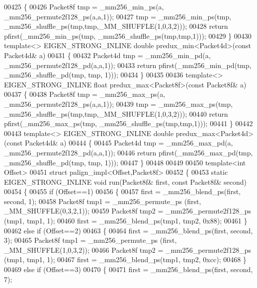 \begin{DoxyCode}
{{00425 \{
00426   Packet8f tmp = \_mm256\_min\_ps(a, \_mm256\_permute2f128\_ps(a,a,1));
00427   tmp = \_mm256\_min\_ps(tmp, \_mm256\_shuffle\_ps(tmp,tmp,\_MM\_SHUFFLE(1,0,3,2)));
00428   \textcolor{keywordflow}{return} pfirst(\_mm256\_min\_ps(tmp, \_mm256\_shuffle\_ps(tmp,tmp,1)));
00429 \}
00430 \textcolor{keyword}{template}<> EIGEN\_STRONG\_INLINE \textcolor{keywordtype}{double} predux\_min<Packet4d>(\textcolor{keyword}{const} Packet4d& a)
00431 \{
00432   Packet4d tmp = \_mm256\_min\_pd(a, \_mm256\_permute2f128\_pd(a,a,1));
00433   \textcolor{keywordflow}{return} pfirst(\_mm256\_min\_pd(tmp, \_mm256\_shuffle\_pd(tmp, tmp, 1)));
00434 \}
00435 
00436 \textcolor{keyword}{template}<> EIGEN\_STRONG\_INLINE \textcolor{keywordtype}{float} predux\_max<Packet8f>(\textcolor{keyword}{const} Packet8f& a)
00437 \{
00438   Packet8f tmp = \_mm256\_max\_ps(a, \_mm256\_permute2f128\_ps(a,a,1));
00439   tmp = \_mm256\_max\_ps(tmp, \_mm256\_shuffle\_ps(tmp,tmp,\_MM\_SHUFFLE(1,0,3,2)));
00440   \textcolor{keywordflow}{return} pfirst(\_mm256\_max\_ps(tmp, \_mm256\_shuffle\_ps(tmp,tmp,1)));
00441 \}
00442 
00443 \textcolor{keyword}{template}<> EIGEN\_STRONG\_INLINE \textcolor{keywordtype}{double} predux\_max<Packet4d>(\textcolor{keyword}{const} Packet4d& a)
00444 \{
00445   Packet4d tmp = \_mm256\_max\_pd(a, \_mm256\_permute2f128\_pd(a,a,1));
00446   \textcolor{keywordflow}{return} pfirst(\_mm256\_max\_pd(tmp, \_mm256\_shuffle\_pd(tmp, tmp, 1)));
00447 \}
00448 
00449 
00450 \textcolor{keyword}{template}<\textcolor{keywordtype}{int} Offset>
00451 \textcolor{keyword}{struct }palign\_impl<Offset,Packet8f>
00452 \{
00453   \textcolor{keyword}{static} EIGEN\_STRONG\_INLINE \textcolor{keywordtype}{void} run(Packet8f& first, \textcolor{keyword}{const} Packet8f& second)
00454   \{
00455     \textcolor{keywordflow}{if} (Offset==1)
00456     \{
00457       first = \_mm256\_blend\_ps(first, second, 1);
00458       Packet8f tmp1 = \_mm256\_permute\_ps (first, \_MM\_SHUFFLE(0,3,2,1));
00459       Packet8f tmp2 = \_mm256\_permute2f128\_ps (tmp1, tmp1, 1);
00460       first = \_mm256\_blend\_ps(tmp1, tmp2, 0x88);
00461     \}
00462     \textcolor{keywordflow}{else} \textcolor{keywordflow}{if} (Offset==2)
00463     \{
00464       first = \_mm256\_blend\_ps(first, second, 3);
00465       Packet8f tmp1 = \_mm256\_permute\_ps (first, \_MM\_SHUFFLE(1,0,3,2));
00466       Packet8f tmp2 = \_mm256\_permute2f128\_ps (tmp1, tmp1, 1);
00467       first = \_mm256\_blend\_ps(tmp1, tmp2, 0xcc);
00468     \}
00469     \textcolor{keywordflow}{else} \textcolor{keywordflow}{if} (Offset==3)
00470     \{
00471       first = \_mm256\_blend\_ps(first, second, 7);
}}
\end{DoxyCode}
